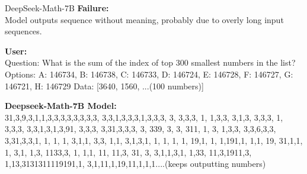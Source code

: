 	\begin{figure*}
		\begin{examplebox}{DeepSeek-Math-7B}
				\textbf{Failure:} \\ Model outputs sequence without meaning, probably due to overly long input sequences. 
				
				\vspace{0.2cm}
				\textbf{User:} \\Question: What is the sum of the index of top 300 smallest numbers in the list? Options: A: 146734, B: 146738, C: 146733, D: 146724, E: 146728, F: 146727, G: 146721, H: 146729 Data: [3640, 1560, ...(100 numbers)]
				
				\vspace{0.3cm}
				\textbf{Deepseek-Math-7B Model:} \\
				31,3,9,3,1,1,3,3,3,3,3,3,3,3, 3,3,1,3,3,3,1,3,3,3, 3, 3,3,3, 1, 1,3,3, 3,1,3, 3,3,3, 1, 3,3,3, 3,3,1,3,1,3,91, 3,3,3, 3,31,3,3,3, 3, 339, 3, 3, 311, 1, 3, 1,3,3, 3,3,6,3,3, 3,31,3,3,1, 1, 1, 1, 3,1,1, 3,3, 1,1, 3,1,3,1, 1, 1, 1, 1, 19,1, 1, 1,191,1, 1,1, 19, 31,1,1, 1, 3,1, 1,3, 1133,3, 1, 1,1, 11, 11,3, 31, 3, 3,1,1,3,1, 1,33, 11,3,1911,3, 1,13,3131311119191,1, 3,1,11,1,19,11,1,1,1....(keeps outputting numbers)
		\end{examplebox}
		\caption{Failure type and conversation record of DeepSeek-Math-7B. The model only generates a series of numbers throughout its output, and we're unable to acquire any useful information from the output.}
		\label{fig:fail_ds_math}
	\end{figure*}	

